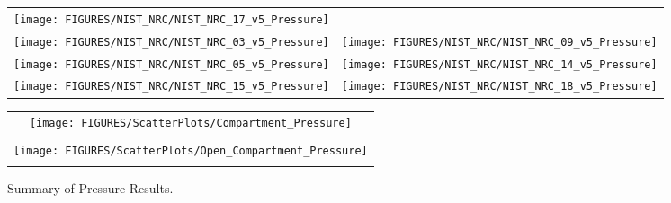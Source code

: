 \begin{figure}[p]
\begin{tabular*}{\textwidth}{l@{\extracolsep{\fill}}r}
\texttt{[image: FIGURES/NIST\_NRC/NIST\_NRC\_17\_v5\_Pressure]} &
   \\
\texttt{[image: FIGURES/NIST\_NRC/NIST\_NRC\_03\_v5\_Pressure]} &
\texttt{[image: FIGURES/NIST\_NRC/NIST\_NRC\_09\_v5\_Pressure]} \\
\texttt{[image: FIGURES/NIST\_NRC/NIST\_NRC\_05\_v5\_Pressure]} &
\texttt{[image: FIGURES/NIST\_NRC/NIST\_NRC\_14\_v5\_Pressure]} \\
\texttt{[image: FIGURES/NIST\_NRC/NIST\_NRC\_15\_v5\_Pressure]} &
\texttt{[image: FIGURES/NIST\_NRC/NIST\_NRC\_18\_v5\_Pressure]}
\end{tabular*}
\label{NIST_NRC_Pressure_Open}
\end{figure}

\begin{figure}[p]
\begin{center}
\begin{tabular}{c}
\texttt{[image: FIGURES/ScatterPlots/Compartment\_Pressure]} \\
\vspace{0.25in} \\
\texttt{[image: FIGURES/ScatterPlots/Open\_Compartment\_Pressure]} \\
\vspace{0.25in}
\end{tabular}
\caption{Summary of Pressure Results.}
\end{center}
\end{figure}


